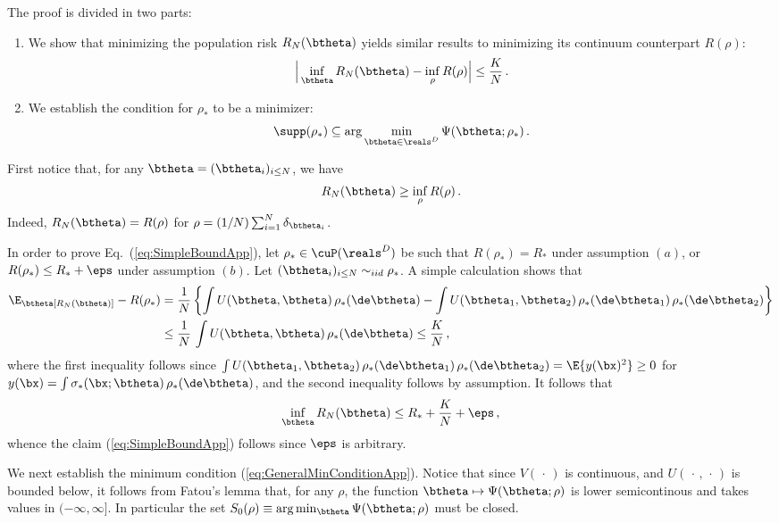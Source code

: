 \documentclass[11pt]{article}
\begin{document}
The proof is divided in two parts:
%
\begin{enumerate}
\item We show that minimizing the population risk $R_N(\btheta)$ yields similar results to minimizing its continuum counterpart $R(\rho)$:
%
\begin{align}
%
\Big|\inf_{\btheta}R_N(\btheta)-\inf_{\rho}R(\rho)\Big|\le \frac{K}{N}\, . \label{eq:SimpleBoundApp}
%
\end{align}
%
\item We establish the condition for $\rho_*$ to be a minimizer:
%
\begin{align}
%
\supp(\rho_*)\subseteq \arg\min_{\btheta\in\reals^D}\Psi(\btheta;\rho_*)\, . \label{eq:GeneralMinConditionApp}
%
\end{align}
%
\end{enumerate}

First notice that, for any $\btheta = (\btheta_i)_{i\le N}$, we have 
%
\begin{align}
%
R_N(\btheta) \ge \inf_{\rho} R(\rho)\, .
%
\end{align}
%
Indeed, $R_N(\btheta) = R(\rho)$ for $\rho = (1/N)\sum_{i=1}^N\delta_{\btheta_i}$. 

In order to prove Eq.~(\ref{eq:SimpleBoundApp}), let $\rho_*\in \cuP(\reals^D)$ be such that $R(\rho_*)= R_*$
under  assumption $(a)$, or  $R(\rho_*)\le  R_*+\eps$ under  assumption $(b)$. Let $(\btheta_i)_{i\le N} \sim_{iid} \rho_*$. A simple calculation shows that
%
\begin{align}
%
\E_\btheta [R_N(\btheta)] -R(\rho_*) &= \frac{1}{N}\left\{\int U(\btheta, \btheta)\, \rho_*(\de \btheta) - \int U(\btheta_1,\btheta_2)\, \rho_*(\de\btheta_1)\, \rho_*(\de\btheta_2) \right\}\\
&\le \frac{1}{N}\, \int U(\btheta, \btheta)\, \rho_*(\de \btheta) \le \frac{K}{N}\, ,
%
\end{align}
%
where the first inequality follows since $\int U(\btheta_1,\btheta_2)\, \rho_*(\de\btheta_1)\, \rho_*(\de\btheta_2) = \E\{y(\bx)^2\}\ge 0$ for
$y(\bx) = \int \sigma_*(\bx;\btheta)\, \rho_*(\de\btheta)$, and the second inequality follows by assumption. It follows that
%
\begin{align}
%
\inf_{\btheta} R_N(\btheta) \le R_*+\frac{K}{N}+\eps\, ,
%
\end{align}
%
whence the claim (\ref{eq:SimpleBoundApp})  follows since $\eps$ is arbitrary.



We next establish the minimum condition (\ref{eq:GeneralMinConditionApp}).
Notice that since $V(\,\cdot\, )$ is continuous, and $U(\,\cdot\,,\,\cdot\,)$ is bounded below, it follows
from Fatou's lemma that, for any $\rho$, the function $\btheta\mapsto\Psi(\btheta;\rho)$ is lower semicontinous
and takes values in $(-\infty,\infty]$. In particular the set $S_0(\rho)\equiv\arg\min_{\btheta} \Psi(\btheta;\rho)$
must be closed.
\end{document}
